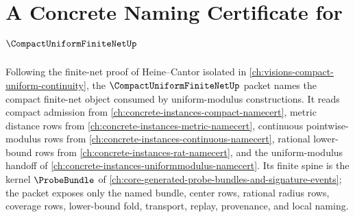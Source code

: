 \chapter{A Concrete Naming Certificate for $\CompactUniformFiniteNetUp$}
\label{ch:concrete-instances-compact-uniform-finite-net-namecert}

Following the finite-net proof of Heine--Cantor isolated in \autoref{ch:visions-compact-uniform-continuity}, the $\CompactUniformFiniteNetUp$ packet names the compact finite-net object consumed by uniform-modulus constructions. It reads compact admission from \autoref{ch:concrete-instances-compact-namecert}, metric distance rows from \autoref{ch:concrete-instances-metric-namecert}, continuous pointwise-modulus rows from \autoref{ch:concrete-instances-continuous-namecert}, rational lower-bound rows from \autoref{ch:concrete-instances-rat-namecert}, and the uniform-modulus handoff of \autoref{ch:concrete-instances-uniformmodulus-namecert}. Its finite spine is the kernel $\ProbeBundle$ of \autoref{ch:core-generated-probe-bundles-and-signature-events}; the packet exposes only the named bundle, center rows, rational radius rows, coverage rows, lower-bound fold, transport, replay, provenance, and local naming.

